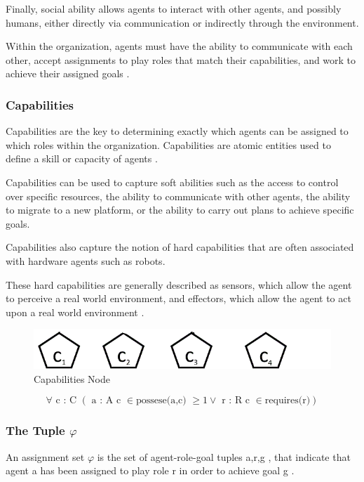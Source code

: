 Finally, social ability allows agents to interact with
other agents, and possibly humans, either directly via communication or indirectly through the
environment.

Within the organization, agents must have the ability to communicate with each other, accept
assignments to play roles that match their capabilities, and work to achieve their assigned goals \cite{omacs2}.


\subsubsection{Capabilities} 

Capabilities are the key to determining exactly which agents can be assigned to which roles
within the organization. Capabilities are atomic entities used to define a skill or capacity of
agents \cite{omacs2}.

Capabilities can be used to capture soft abilities such as the access to control over specific
resources, the ability to communicate with other agents, the ability to migrate to a new platform,
or the ability to carry out plans to achieve specific goals. 

Capabilities also capture the notion of hard capabilities that are often associated 
with hardware agents such as robots. 

These hard capabilities are generally described as sensors, which allow the agent to perceive a real world
environment, and effectors, which allow the agent to act upon a real world environment \cite{omacs2}.

\hspace{1cm}
\begin{figure}[th]
	\centering
		\includegraphics[scale=0.5]{ch1/img/capabilities}
	\caption{\label{fig:Cap Node}Capabilities Node}
\end{figure}
\hspace{0.5cm}


\begin{equation}
\forall\textrm{ c : C }\left(\textrm{ a : A c }\in\textrm{possese(a,c) }\geq1\lor\textrm{ r : R c }\in\textrm{requires(r)}\right)\label{eq : capabilities}
\end{equation}


\subsubsection{The Tuple $\varphi$} 
An assignment set $\varphi$ is the set of agent-role-goal tuples \textlangle{} a,r,g \textrangle{}, that indicate that agent a has been assigned to play role r in order to achieve goal g \cite{omacs4}.

